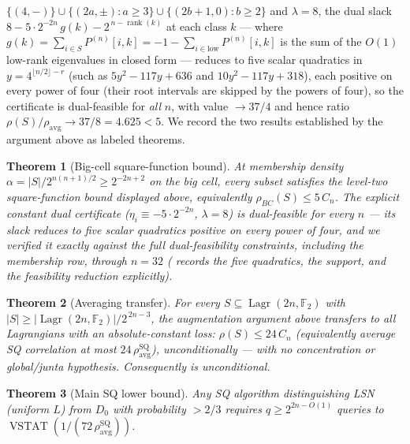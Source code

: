 \documentclass[11pt,a4paper]{article}
\theoremstyle{plain}
\newtheorem{theorem}{Theorem}[section]
\theoremstyle{definition}
\newcommand{\F}{\mathbb{F}}
\DeclareMathOperator{\Lagr}{Lagr}
\DeclareMathOperator{\VSTAT}{VSTAT}
\begin{document}
$\{(4,-)\}\cup\{(2a,\pm):a\ge 3\}\cup\{(2b{+}1,0):b\ge 2\}$ and $\lambda=8$, the dual slack $8-5\cdot 2^{-2n}\,g(k)-2^{\,n-\operatorname{rank}(k)}$ at each class $k$ --- where $g(k)=\sum_{i\in S}P^{(n)}[i,k]=-1-\sum_{i\in\mathrm{low}}P^{(n)}[i,k]$ is the sum of the $O(1)$ low-rank eigenvalues in closed form --- reduces to five scalar quadratics in $y=4^{\lfloor n/2\rfloor-r}$ (such as $5y^2-117y+636$ and $10y^2-117y+318$), each positive on every power of four (their root intervals are skipped by the powers of four), so the certificate is dual-feasible for \emph{all} $n$, with value $\to 37/4$ and hence ratio $\rho(S)/\rho_{\mathrm{avg}}\to 37/8=4.625<5$. We record the two results established by the argument above as labeled theorems.

\begin{theorem}[Big-cell square-function bound]\label{thm:bigcell}
At membership density $\alpha=|S|/2^{n(n+1)/2}\ge 2^{-2n+2}$ on the big cell, every subset satisfies the level-two square-function bound displayed above, equivalently $\rho_{BC}(S)\le 5\,C_n$. The explicit constant dual certificate ($\eta_i\equiv-5\cdot2^{-2n}$, $\lambda=8$) is dual-feasible for every $n$ --- its slack reduces to five scalar quadratics positive on every power of four, and we verified it exactly against the full dual-feasibility constraints, including the membership row, through $n=32$ ( records the five quadratics, the support, and the feasibility reduction explicitly).
\end{theorem}

\begin{theorem}[Averaging transfer]\label{thm:avg-transfer}
For every $S\subseteq\Lagr(2n,\F_2)$ with $|S|\ge|\Lagr(2n,\F_2)|/2^{\,2n-3}$, the augmentation argument above transfers  to all Lagrangians with an absolute-constant loss: $\rho(S)\le 24\,C_n$ (equivalently average SQ correlation at most $24\,\rho_{\mathrm{avg}}^{\mathrm{SQ}}$), unconditionally --- with no concentration or global/junta hypothesis. Consequently  is unconditional.
\end{theorem}

\begin{theorem}[Main SQ lower bound]
\label{thm:main-sq-cond}
Any SQ algorithm distinguishing LSN (uniform $L$) from $D_0$ with probability $> 2/3$ requires $q \geq 2^{2n - O(1)}$ queries to $\VSTAT(1/(72\,\rho_{\mathrm{avg}}^{\mathrm{SQ}}))$.
\end{theorem}
\end{document}
